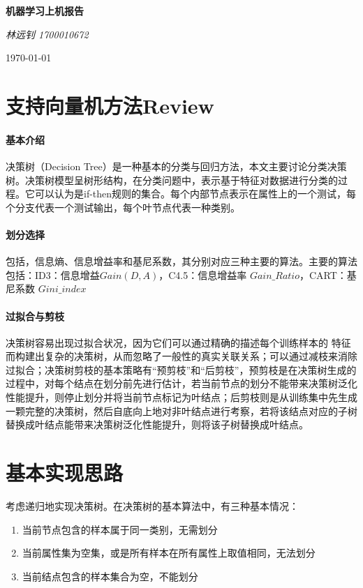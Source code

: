 \documentclass[UTF8]{ctexart}
\begin{document}
	\begin{titlepage}
		\vspace*{\fill}
		\begin{center}
			\normalfont
			{\Huge \bfseries 机器学习上机报告}
			
			\bigskip
			
			{\Large \itshape 林远钊 1700010672}
			
			\medskip
			
			\today
		\end{center}
	\end{titlepage}
	\newpage
	\tableofcontents
	
	\newpage
\section{支持向量机方法Review}
\paragraph{基本介绍}决策树（Decision Tree）是一种基本的分类与回归方法，本文主要讨论分类决策树。决策树模型呈树形结构，在分类问题中，表示基于特征对数据进行分类的过程。它可以认为是if-then规则的集合。每个内部节点表示在属性上的一个测试，每个分支代表一个测试输出，每个叶节点代表一种类别。

\paragraph{划分选择} 包括，信息熵、信息增益率和基尼系数，其分别对应三种主要的算法。主要的算法包括：ID3：信息增益$Gain(D,A)$，C4.5：信息增益率 $Gain\_Ratio$，CART：基尼系数 $Gini\_index$

\paragraph{过拟合与剪枝}决策树容易出现过拟合状况，因为它们可以通过精确的描述每个训练样本的 特征而构建出复杂的决策树，从而忽略了一般性的真实关联关系；可以通过减枝来消除过拟合；决策树剪枝的基本策略有“预剪枝”和“后剪枝”，预剪枝是在决策树生成的过程中，对每个结点在划分前先进行估计，若当前节点的划分不能带来决策树泛化性能提升，则停止划分并将当前节点标记为叶结点；后剪枝则是从训练集中先生成一颗完整的决策树，然后自底向上地对非叶结点进行考察，若将该结点对应的子树替换成叶结点能带来决策树泛化性能提升，则将该子树替换成叶结点。

\section{基本实现思路}
考虑递归地实现决策树。在决策树的基本算法中，有三种基本情况：
\begin{enumerate}
	\item 当前节点包含的样本属于同一类别，无需划分
	\item 当前属性集为空集，或是所有样本在所有属性上取值相同，无法划分
	\item 当前结点包含的样本集合为空，不能划分
\end{enumerate}
\end{document}

